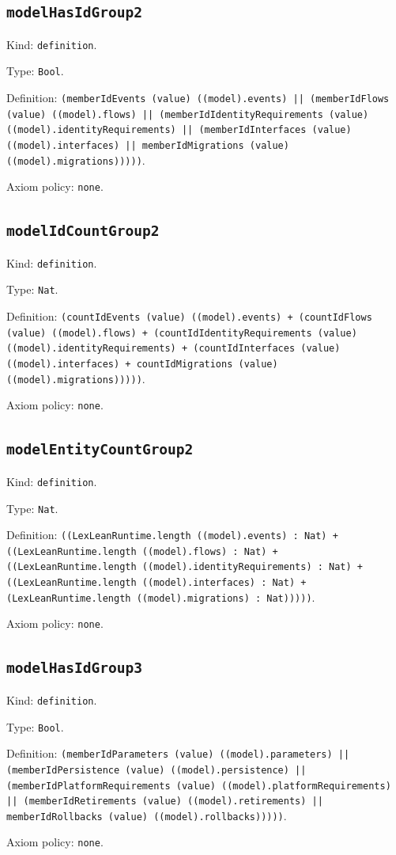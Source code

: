 \documentclass[11pt]{article}
\begin{document}
\subsection*{\texttt{modelHasIdGroup2}}
\noindent Kind: \texttt{definition}.\par
\noindent Type: \texttt{Bool}.\par
\noindent Definition: \texttt{(memberIdEvents (value) ((model).events) || (memberIdFlows (value) ((model).flows) || (memberIdIdentityRequirements (value) ((model).identityRequirements) || (memberIdInterfaces (value) ((model).interfaces) || memberIdMigrations (value) ((model).migrations)))))}.\par
\noindent Axiom policy: \texttt{none}.\par
\subsection*{\texttt{modelIdCountGroup2}}
\noindent Kind: \texttt{definition}.\par
\noindent Type: \texttt{Nat}.\par
\noindent Definition: \texttt{(countIdEvents (value) ((model).events) + (countIdFlows (value) ((model).flows) + (countIdIdentityRequirements (value) ((model).identityRequirements) + (countIdInterfaces (value) ((model).interfaces) + countIdMigrations (value) ((model).migrations)))))}.\par
\noindent Axiom policy: \texttt{none}.\par
\subsection*{\texttt{modelEntityCountGroup2}}
\noindent Kind: \texttt{definition}.\par
\noindent Type: \texttt{Nat}.\par
\noindent Definition: \texttt{((LexLeanRuntime.length ((model).events) : Nat) + ((LexLeanRuntime.length ((model).flows) : Nat) + ((LexLeanRuntime.length ((model).identityRequirements) : Nat) + ((LexLeanRuntime.length ((model).interfaces) : Nat) + (LexLeanRuntime.length ((model).migrations) : Nat)))))}.\par
\noindent Axiom policy: \texttt{none}.\par
\subsection*{\texttt{modelHasIdGroup3}}
\noindent Kind: \texttt{definition}.\par
\noindent Type: \texttt{Bool}.\par
\noindent Definition: \texttt{(memberIdParameters (value) ((model).parameters) || (memberIdPersistence (value) ((model).persistence) || (memberIdPlatformRequirements (value) ((model).platformRequirements) || (memberIdRetirements (value) ((model).retirements) || memberIdRollbacks (value) ((model).rollbacks)))))}.\par
\noindent Axiom policy: \texttt{none}.\par
\end{document}
